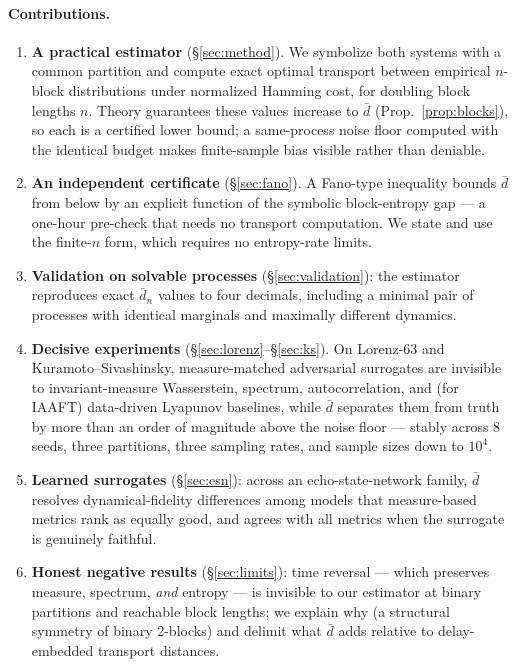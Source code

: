 \documentclass[11pt]{article}
\newcommand{\dbar}{\bar d}
\begin{document}
\paragraph{Contributions.}
\begin{enumerate}\itemsep2pt
\item \textbf{A practical estimator} (\S\ref{sec:method}). We symbolize both systems with
a common partition and compute exact optimal transport between empirical $n$-block
distributions under normalized Hamming cost, for doubling block lengths $n$. Theory
guarantees these values increase to $\dbar$ (Prop.~\ref{prop:blocks}), so each is a
certified lower bound; a same-process noise floor computed with the identical budget
makes finite-sample bias visible rather than deniable.
\item \textbf{An independent certificate} (\S\ref{sec:fano}). A Fano-type inequality
bounds $\dbar$ from below by an explicit function of the symbolic block-entropy gap ---
a one-hour pre-check that needs no transport computation. We state and use the
finite-$n$ form, which requires no entropy-rate limits.
\item \textbf{Validation on solvable processes} (\S\ref{sec:validation}): the estimator
reproduces exact $\dbar_n$ values to four decimals, including a minimal pair of
processes with identical marginals and maximally different dynamics.
\item \textbf{Decisive experiments} (\S\ref{sec:lorenz}--\S\ref{sec:ks}). On Lorenz-63
and Kuramoto--Sivashinsky, measure-matched adversarial surrogates are invisible to
invariant-measure Wasserstein, spectrum, autocorrelation, and (for IAAFT) data-driven
Lyapunov baselines, while $\dbar$ separates them from truth by more than an order of
magnitude above the noise floor --- stably across 8 seeds, three partitions, three
sampling rates, and sample sizes down to $10^4$.
\item \textbf{Learned surrogates} (\S\ref{sec:esn}): across an echo-state-network family,
$\dbar$ resolves dynamical-fidelity differences among models that measure-based metrics
rank as equally good, and agrees with all metrics when the surrogate is genuinely faithful.
\item \textbf{Honest negative results} (\S\ref{sec:limits}): time reversal --- which
preserves measure, spectrum, \emph{and} entropy --- is invisible to our estimator at
binary partitions and reachable block lengths; we explain why (a structural symmetry of
binary $2$-blocks) and delimit what $\dbar$ adds relative to delay-embedded transport
distances.
\end{enumerate}
\end{document}
